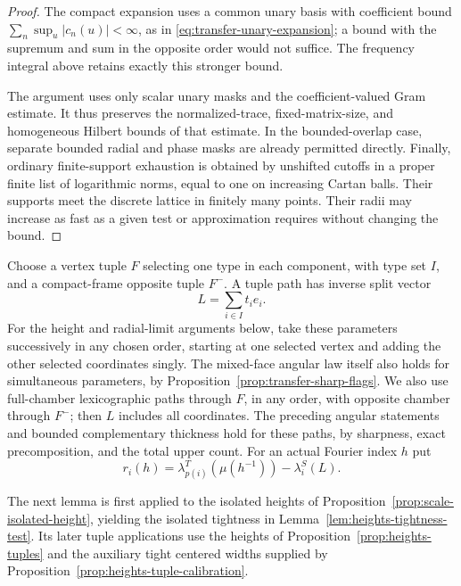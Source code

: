 \begin{proof}
The compact expansion uses a common unary basis with coefficient bound
$\sum_n\sup_u|c_n(u)|<\infty$, as in
\eqref{eq:transfer-unary-expansion}; a bound with the supremum and sum in
the opposite order would not suffice.  The frequency integral above
retains exactly this stronger bound.

The argument uses only scalar unary masks and the coefficient-valued Gram
estimate.  It thus preserves the normalized-trace, fixed-matrix-size, and
homogeneous Hilbert bounds of that estimate.  In the bounded-overlap case,
separate bounded radial and phase masks are already permitted directly.
Finally, ordinary finite-support exhaustion is obtained by unshifted
cutoffs in a proper finite list of logarithmic norms, equal to one on
increasing Cartan balls.  Their supports meet the discrete lattice in
finitely many points.  Their radii may increase as fast as a given test or
approximation requires without changing the bound.
\end{proof}

Choose a vertex tuple $F$ selecting one type in each component, with type
set $I$, and a compact-frame opposite tuple $F^-$.  A tuple path has inverse
split vector
\[
 L=\sum_{i\in I}t_i e_i.
\]
For the height and radial-limit arguments below, take these parameters
successively in any chosen order, starting at one selected vertex and
adding the other selected coordinates singly.  The mixed-face angular
law itself also holds for simultaneous parameters, by
Proposition~\ref{prop:transfer-sharp-flags}.
We also use full-chamber lexicographic paths through $F$, in any order,
with opposite chamber through $F^-$; then $L$ includes all coordinates.
The preceding angular statements and bounded complementary thickness hold
for these paths, by sharpness, exact precomposition, and the total upper
count.  For an actual Fourier index $h$ put
\[
 r_i(h)=\lambda_{p(i)}^T(\mu(h^{-1}))-\lambda_i^S(L).
\]

The next lemma is first applied to the isolated heights of
Proposition~\ref{prop:scale-isolated-height}, yielding the isolated
tightness in Lemma~\ref{lem:heights-tightness-test}. Its later tuple
applications use the heights of Proposition~\ref{prop:heights-tuples}
and the auxiliary tight centered widths supplied by
Proposition~\ref{prop:heights-tuple-calibration}.

